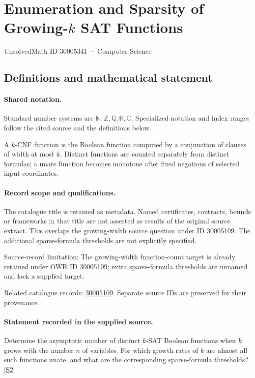 \documentclass[11pt]{article}
\newcommand{\sref}[2]{\hyperlink{source:#1:#2}{[S#2]}}
\begin{document}
\setcounter{section}{30005340}
\section{Enumeration and Sparsity of Growing-$k$ SAT Functions}\label{30005341}
{\small\sffamily UnsolvedMath ID 30005341 · Computer Science}
\subsection{Definitions and mathematical statement}

\paragraph{Shared notation.}Standard number systems are $\mathbb N,\mathbb Z,\mathbb Q,\mathbb R,\mathbb C$. Specialized notation and index ranges follow the cited source and the definitions below.


A $k$-CNF function is the Boolean function computed by a conjunction of clauses of width at most $k$. Distinct functions are counted separately from distinct formulas; a unate function becomes monotone after fixed negations of selected input coordinates.
\paragraph{Record scope and qualifications.}
The catalogue title is retained as metadata. Named certificates, contracts, bounds or frameworks in that title are not asserted as results of the original source extract.
This overlaps the growing-width source question under ID 30005109. The additional sparse-formula thresholds are not explicitly specified.

Source-record limitation: The growing-width function-count target is already retained under OWR ID 30005109; extra sparse-formula thresholds are unnamed and lack a supplied target.

Related catalogue records: \href{https://mehmetmars7.github.io/Erdosproblems-llm-hunter/problem.html?type=open_problems&id=30005109}{30005109}. Separate source IDs are preserved for their provenance.
\paragraph{Statement recorded in the supplied source.}
Determine the asymptotic number of distinct $k$-SAT Boolean functions when $k$ grows with the number $n$ of variables. For which growth rates of $k$ are almost all such functions unate, and what are the corresponding sparse-formula thresholds? \sref{30005341}{2}
\end{document}
